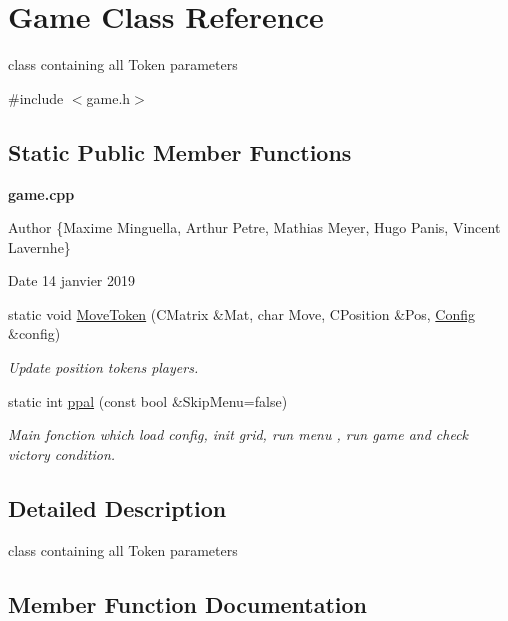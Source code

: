 \hypertarget{class_game}{}\section{Game Class Reference}
\label{class_game}


class containing all Token parameters  




{\ttfamily \#include $<$game.\+h$>$}

\subsection*{Static Public Member Functions}
\begin{Indent}\textbf{ game.\+cpp}\par
{\em \begin{DoxyAuthor}{Author}
\{Maxime Minguella, Arthur Petre, Mathias Meyer, Hugo Panis, Vincent Lavernhe\}
\end{DoxyAuthor}
\begin{DoxyDate}{Date}
14 janvier 2019 
\end{DoxyDate}
}\begin{DoxyCompactItemize}
\item 
static void \hyperlink{class_game_a6aa2cd0cdca06695db181e0051dc6d86}{Move\+Token} (C\+Matrix \&Mat, char Move, C\+Position \&Pos, \hyperlink{class_config}{Config} \&config)
\begin{DoxyCompactList}\small\item\em Update position tokens players. \end{DoxyCompactList}\item 
static int \hyperlink{class_game_a038c09e06e898ae395652c8b930fd9d7}{ppal} (const bool \&Skip\+Menu=false)
\begin{DoxyCompactList}\small\item\em Main fonction which load config, init grid, run menu , run game and check victory condition. \end{DoxyCompactList}\end{DoxyCompactItemize}
\end{Indent}


\subsection{Detailed Description}
class containing all Token parameters 

\subsection{Member Function Documentation}
\mbox{\label{class_game_a6aa2cd0cdca06695db181e0051dc6d86}} 
